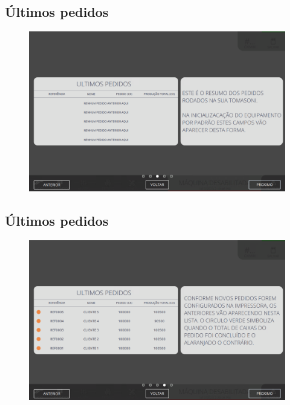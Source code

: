 \newpage
\thispagestyle{fancy}
\vspace{\fill}

\subsection{\small{Últimos pedidos}}

\begin{figure}
    \centering
    \includegraphics[width=576 px,height=360 px]{src/imagesICV/01-main/4.png}
\end{figure}

\newpage
\thispagestyle{fancy}
\vspace{\fill}

\subsection{\small{Últimos pedidos}}

\begin{figure}
    \centering
    \includegraphics[width=576 px,height=360 px]{src/imagesICV/01-main/5.png}
\end{figure}

